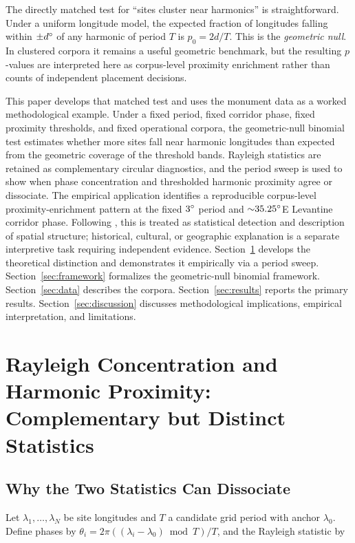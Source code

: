 \documentclass[12pt,a4paper]{article}
\newcommand{\degr}{\ifmmode^\circ\else\textdegree{}\fi}
\begin{document}
The directly matched test for ``sites cluster near harmonics'' is
straightforward. Under a uniform longitude model, the expected fraction
of longitudes falling within $\pm d\degr$ of any harmonic of period $T$
is $p_0 = 2d/T$. This is the \emph{geometric null}. In clustered
corpora it remains a useful geometric benchmark, but the resulting
$p$-values are interpreted here as corpus-level proximity enrichment
rather than counts of independent placement decisions.

This paper develops that matched test and uses the monument data as a
worked methodological example. Under a fixed period, fixed corridor phase,
fixed proximity thresholds, and fixed operational corpora, the
geometric-null binomial test estimates whether more sites fall near
harmonic longitudes than expected from the geometric coverage of the
threshold bands. Rayleigh statistics are retained as complementary
circular diagnostics, and the period sweep is used to show when phase
concentration and thresholded harmonic proximity agree or dissociate.
The empirical application identifies a reproducible corpus-level
proximity-enrichment pattern at the fixed $3\degr$ period and
${\sim}35.25\degr$E Levantine corridor phase. Following
\citet{silva2020statistical}, this
is treated as statistical detection and description of spatial
structure; historical, cultural, or geographic explanation is a
separate interpretive task requiring independent evidence.
Section~\ref{sec:rayleigh_dissociation} develops the theoretical
distinction and demonstrates it empirically via a period sweep.
Section~\ref{sec:framework} formalizes the geometric-null binomial
framework. Section~\ref{sec:data} describes the corpora.
Section~\ref{sec:results} reports the primary results. Section~\ref{sec:discussion}
discusses methodological implications, empirical interpretation, and
limitations.

\section{Rayleigh Concentration and Harmonic Proximity:\\
Complementary but Distinct Statistics}
\label{sec:rayleigh_dissociation}

\subsection{Why the Two Statistics Can Dissociate}

Let $\lambda_1, \ldots, \lambda_N$ be site longitudes and $T$ a
candidate grid period with anchor $\lambda_0$. Define phases by
$\theta_i = 2\pi((\lambda_i - \lambda_0) \bmod T)/T$, and the
Rayleigh statistic by
\end{document}
